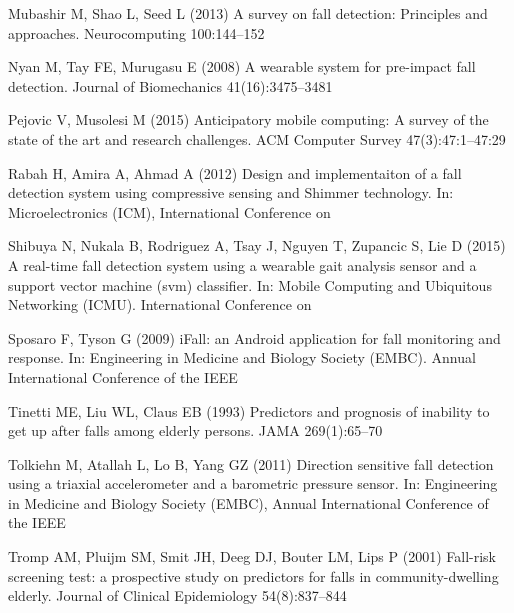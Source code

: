\documentclass[twocolumn]{svjour3}          \smartqed  \usepackage[draft]{hyperref}
\begin{document}
\begin{thebibliography}{41}
Mubashir M, Shao L, Seed L (2013) A survey on fall detection: {Principles} and
  approaches. Neurocomputing 100:144--152

Nyan M, Tay FE, Murugasu E (2008) A wearable system for pre-impact fall
  detection. Journal of Biomechanics 41(16):3475--3481

Pejovic V, Musolesi M (2015) Anticipatory mobile computing: A survey of the
  state of the art and research challenges. ACM Computer Survey
  47(3):47:1--47:29

Rabah H, Amira A, Ahmad A (2012) Design and implementaiton of a fall detection
  system using compressive sensing and {S}himmer technology. In:
  Microelectronics ({ICM}), {International} {Conference} on

Shibuya N, Nukala B, Rodriguez A, Tsay J, Nguyen T, Zupancic S, Lie D (2015) A
  real-time fall detection system using a wearable gait analysis sensor and a
  support vector machine (svm) classifier. In: Mobile Computing and Ubiquitous
  Networking (ICMU). International Conference on

Sposaro F, Tyson G (2009) {iFall}: an {Android} application for fall monitoring
  and response. In: Engineering in {Medicine} and {Biology} {Society} {(EMBC)}.
  {Annual} {International} {Conference} of the {IEEE}

Tinetti ME, Liu WL, Claus EB (1993) Predictors and prognosis of inability to
  get up after falls among elderly persons. {JAMA} 269(1):65--70

Tolkiehn M, Atallah L, Lo B, Yang GZ (2011) Direction sensitive fall detection
  using a triaxial accelerometer and a barometric pressure sensor. In:
  Engineering in {Medicine} and {Biology} {Society} {(EMBC)}, {Annual}
  {International} {Conference} of the {IEEE}

Tromp AM, Pluijm SM, Smit JH, Deeg DJ, Bouter LM, Lips P (2001) Fall-risk
  screening test: a prospective study on predictors for falls in
  community-dwelling elderly. Journal of Clinical Epidemiology 54(8):837--844


\end{thebibliography}
\end{document}
